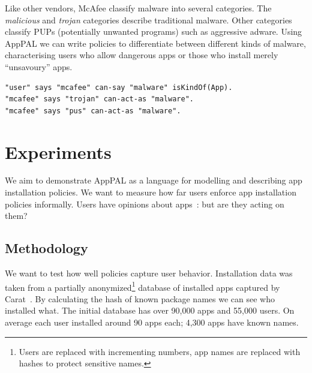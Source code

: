 \documentclass[]{soups-poster}
\newcommand{\citep}[1]{\cite{#1}}
\begin{document}
Like other vendors, McAfee classify malware into several categories.
The \emph{malicious} and \emph{trojan} categories describe traditional malware.
Other categories classify PUPs (potentially unwanted programs) %
such as aggressive adware.
Using AppPAL we can write policies to differentiate between different kinds of malware,
characterising users who allow dangerous apps or those who install merely ``unsavoury'' apps.
\begin{lstlisting}
"user" says "mcafee" can-say "malware" isKindOf(App).
"mcafee" says "trojan" can-act-as "malware".
"mcafee" says "pus" can-act-as "malware".
\end{lstlisting}

%

\section{Experiments}

We aim to demonstrate AppPAL as a language for modelling and describing app installation policies.
We want to measure how far users enforce app installation policies informally.
Users have opinions about apps~\citep{Sadeh:2014vq}: but are they acting on them?

\subsection{Methodology}

We want to test how well policies capture user behavior.
Installation data was taken from a partially anonymized\footnote{Users are replaced with incrementing numbers, app names are replaced with hashes to protect sensitive names.} database of installed apps captured by Carat~\citep{Oliner:2013ht}.
By calculating the hash of known package names we can see who installed what.
%
The initial database has over 90,000 apps and 55,000 users.
On average each user installed around 90 apps each; 4,300 apps have known names.
\end{document}
